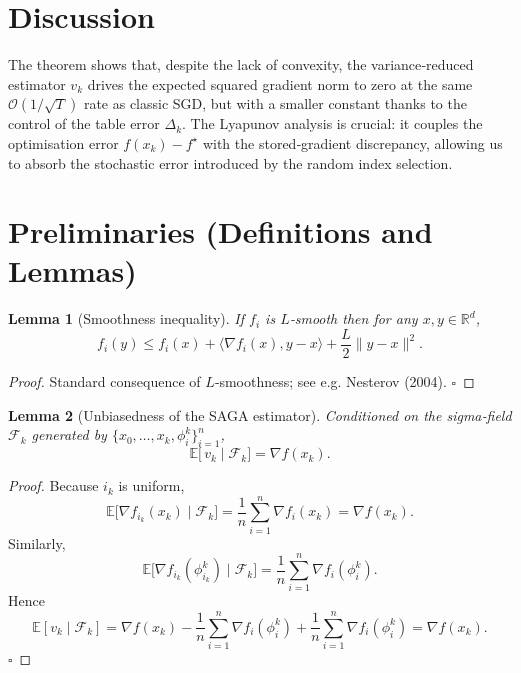 \documentclass{article}
\newtheorem{lemma}{Lemma}
\newcommand{\E}{\mathbb{E}}
\newcommand{\R}{\mathbb{R}}
\begin{document}
\section*{Discussion}
The theorem shows that, despite the lack of convexity, the variance‑reduced estimator $v_k$ drives the expected squared gradient norm to zero at the same $\mathcal{O}(1/\sqrt{T})$ rate as classic SGD, but with a smaller constant thanks to the control of the table error $\Delta_k$. The Lyapunov analysis is crucial: it couples the optimisation error $f(x_k)-f^{\star}$ with the stored‑gradient discrepancy, allowing us to absorb the stochastic error introduced by the random index selection.


\section*{Preliminaries (Definitions and Lemmas)}
\begin{lemma}[Smoothness inequality]\label{lem:smooth}
If $f_i$ is $L$‑smooth then for any $x,y\in\R^{d}$,
\[
f_i(y)\le f_i(x)+\langle\nabla f_i(x),y-x\rangle+\frac{L}{2}\|y-x\|^{2}.
\]
\end{lemma}
\begin{proof}
Standard consequence of $L$‑smoothness; see e.g. Nesterov (2004). \hfill $\square$
\end{proof}

\begin{lemma}[Unbiasedness of the SAGA estimator]\label{lem:unbiased}
Conditioned on the sigma‑field $\mathcal{F}_k$ generated by $\{x_0,\dots,x_k,\phi_i^k\}_{i=1}^{n}$,
\[
\E\!\big[\,v_k\mid\mathcal{F}_k\big]=\nabla f(x_k).
\]
\end{lemma}
\begin{proof}
Because $i_k$ is uniform,
\[
\E\!\big[\nabla f_{i_k}(x_k)\mid\mathcal{F}_k\big]=\frac1n\sum_{i=1}^{n}\nabla f_i(x_k)=\nabla f(x_k).
\]
Similarly,
\[
\E\!\big[\nabla f_{i_k}(\phi_{i_k}^k)\mid\mathcal{F}_k\big]=\frac1n\sum_{i=1}^{n}\nabla f_i(\phi_i^k).
\]
Hence
\[
\E[v_k\mid\mathcal{F}_k]=\nabla f(x_k)-\frac1n\sum_{i=1}^{n}\nabla f_i(\phi_i^k)
+\frac1n\sum_{i=1}^{n}\nabla f_i(\phi_i^k)=\nabla f(x_k).
\] \hfill $\square$
\end{proof}
\end{document}
